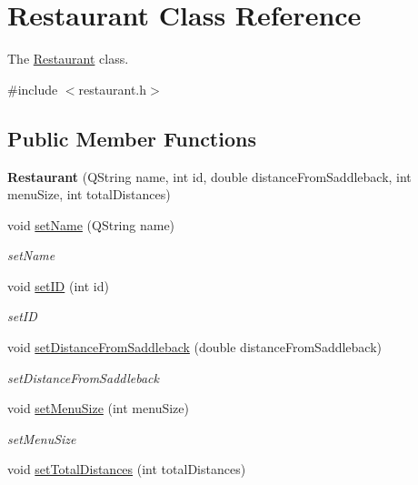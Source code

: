 \hypertarget{class_restaurant}{}\section{Restaurant Class Reference}
\label{class_restaurant}


The \hyperlink{class_restaurant}{Restaurant} class.  




{\ttfamily \#include $<$restaurant.\+h$>$}

\subsection*{Public Member Functions}
\begin{DoxyCompactItemize}
\item 
\mbox{\label{class_restaurant_a18bc8aa1ce501a92842a2090e7d378cc}} 
{\bfseries Restaurant} (Q\+String name, int id, double distance\+From\+Saddleback, int menu\+Size, int total\+Distances)
\item 
void \hyperlink{class_restaurant_aec426da0e4c067525fdd1d233c32a5f3}{set\+Name} (Q\+String name)
\begin{DoxyCompactList}\small\item\em set\+Name \end{DoxyCompactList}\item 
void \hyperlink{class_restaurant_a156dd173f171f1f170191dadb7153b8f}{set\+ID} (int id)
\begin{DoxyCompactList}\small\item\em set\+ID \end{DoxyCompactList}\item 
void \hyperlink{class_restaurant_a12aea2979807bd2132f16f706b634ad4}{set\+Distance\+From\+Saddleback} (double distance\+From\+Saddleback)
\begin{DoxyCompactList}\small\item\em set\+Distance\+From\+Saddleback \end{DoxyCompactList}\item 
void \hyperlink{class_restaurant_aa4a36310566791865760329edb61dfef}{set\+Menu\+Size} (int menu\+Size)
\begin{DoxyCompactList}\small\item\em set\+Menu\+Size \end{DoxyCompactList}\item 
void \hyperlink{class_restaurant_a014e06c350423b40fcfdac1bcbdd6ab1}{set\+Total\+Distances} (int total\+Distances)

\end{DoxyCompactItemize}
